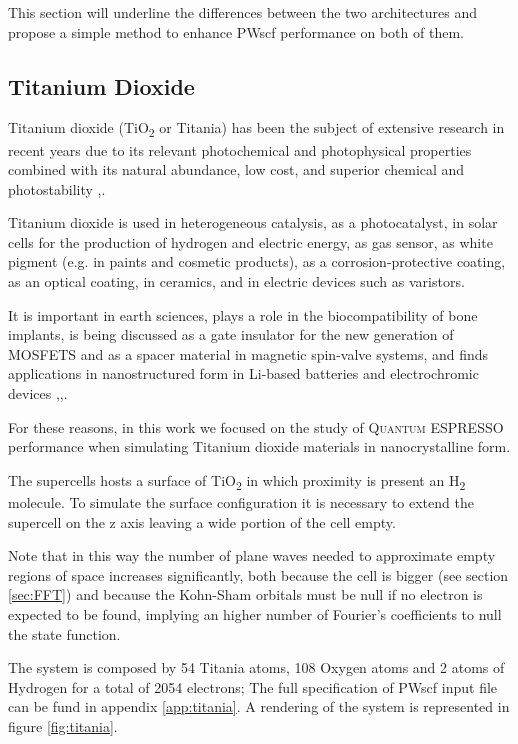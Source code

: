 \documentclass[a4paper,12pt]{article}
\newcommand\QE{\textsc{Quantum} ESPRESSO }
\begin{document}
This section will underline the differences between the two architectures and propose a simple method to enhance PWscf performance on both of them.

\newpage

\subsection{Titanium Dioxide}\label{sec:titania}

Titanium dioxide (TiO\textsubscript{2} or  Titania) has been the subject of extensive research in recent years due to its relevant photochemical and photophysical properties combined with its natural abundance, low cost, and superior chemical and photostability \cite{Titania1},\cite{Titania3}. 

Titanium dioxide is used in heterogeneous catalysis, as a photocatalyst, in solar cells for the production of hydrogen and electric energy, as gas sensor, as white pigment (e.g. in paints and cosmetic products), as a corrosion-protective coating, as an optical coating, in ceramics, and in electric devices such as varistors. 

It is important in earth sciences, plays a role in the biocompatibility of bone implants, is being discussed as a gate insulator for the new generation of MOSFETS and as a spacer material in magnetic spin-valve systems, and finds applications in nanostructured form in Li-based batteries and electrochromic devices \cite{Titania2},\cite{Titania4},\cite{Titania5}.

For these reasons, in this work we focused on the study of \QE performance when simulating Titanium dioxide  materials in nanocrystalline form.

The supercells hosts a surface of TiO\textsubscript{2} in which proximity is present an H\textsubscript{2} molecule.
To simulate the surface configuration it is necessary to extend the supercell on the z axis leaving a wide portion of the cell empty.

Note that in this way the number of plane waves needed to approximate empty regions of space increases significantly, both because the cell is bigger (see section \ref{sec:FFT}) and because the Kohn-Sham orbitals must be null if no electron is expected to be found, implying an higher number of Fourier's coefficients to null the state function.

The system is composed by 54 Titania atoms, 108 Oxygen atoms and 2 atoms of Hydrogen for a total of 2054 electrons; 
The full specification of PWscf input file can be fund in appendix \ref{app:titania}. 
A rendering of the system is represented in figure \ref{fig:titania}.
\end{document}
